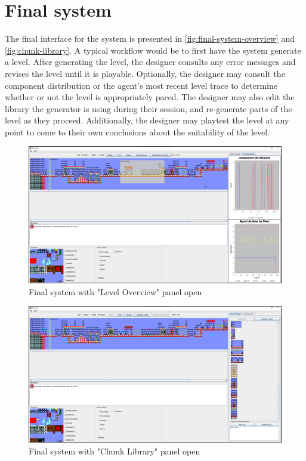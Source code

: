 \section{Final system}

The final interface for the system is presented in \autoref{fig:final-system-overview} and
\autoref{fig:chunk-library}. A typical workflow would be to first have the system generate
a level. After generating the level, the designer consults any error messages and revises
the level until it is playable. Optionally, the designer may consult the component distribution
or the agent's most recent level trace to determine whether or not the level is appropriately
paced. The designer may also edit the library the generator is using during their session,
and re-generate parts of the level as they proceed. Additionally, the designer may playtest
the level at any point to come to their own conclusions about the suitability of the level.

\begin{figure}[ht]
    \includegraphics[width=\linewidth]{img/fig14-final-system-overview.png}
    \caption{Final system with "Level Overview" panel open}
    \label{fig:final-system-overview}
\end{figure}

\begin{figure}[ht]
    \includegraphics[width=\linewidth]{img/fig15-chunk-library.png}
    \caption{Final system with "Chunk Library" panel open}
    \label{fig:chunk-library}
\end{figure}